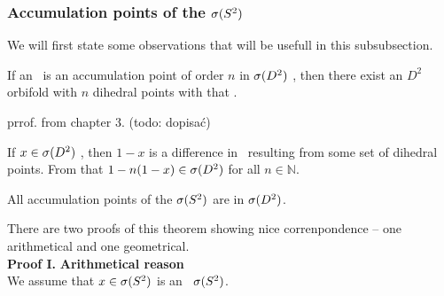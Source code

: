 \subsubsection{Accumulation points of the ${{\sigma}(S^2)}$}
We will first state some observations that will be usefull in this subsubsection.
\begin{observation}
If an \Eoc\ is an accumulation point of order $n$ in ${{\sigma}(D^2)}$ , 
then there exist an $D^2$  
orbifold with $n$ dihedral  points with that \Eoc. 
\end{observation}
prrof. from chapter 3. (todo: dopisać)
\begin{observation}\label{adding_multiplied_differences}
If $x \in {{\sigma}(D^2)}$ , then $1-x$  is 
a difference in 
\Eoc\ resulting 
from some set of dihedral  points. From that $1-n(1-x) \in {{\sigma}(D^2)}$ 
for all $n \in \mathbb{N}$. 
\end{observation}
\begin{theorem}
All accumulation points of the ${{\sigma}(S^2)}$ are in ${{\sigma}(D^2)}$.
\end{theorem}
There are two proofs of this theorem showing nice correnpondence -- one arithmetical and 
one geometrical. 
\\
\textbf{Proof I.}
\textbf{Arithmetical reason} \\
We assume that $x \in {{\sigma}(S^2)}$ is an \apots\ ${{\sigma}(S^2)}$.\\
